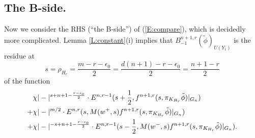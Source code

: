 \documentclass[10pt]{amsart}
\theoremstyle{plain}
\numberwithin{equation}{section}
\begin{document}
\subsection{ \bf The B-side.}
 Now we consider the RHS (``the B-side'') of (\ref{E:compare}), which
 is decidedly more complicated. Lemma \ref{L:constant}(i) implies that
 $ B^{n+1,r}_{-1}(\tilde{\phi})_{U(Y_1)}$ is the residue at 
 \[  s = \rho_{H_r}= \frac{m-r-\epsilon_0}{2} =  \frac{d(n+1) - r
   -\epsilon_0}{2} = \frac{n+1-r}{2} \]
 of the function 
 \begin{align}\label{E:B-side}
   & \chi | - |^{s+ n+1 - \frac{r - \epsilon_0}{2} } \cdot
   E^{n,r-1}(s+\frac{1}{2}, f^{n+1,r}(s, \pi_{K_{H_r}}
   \tilde{\phi})|_{G_{n}}) \\
+ &\chi |-|^{m/2} \cdot E^{n,r} ( s,  M(w^+,s) f^{n+1,r}(s,
\pi_{K_{H_r}} \tilde{\phi})|_{G_{n}} ) \notag \\
+ &\chi |-|^{-s + n+1 - \frac{r- \epsilon_0}{2}} \cdot E^{n,r-1}(s -
\frac{1}{2},  M(w^-,s) f^{n+1,r}(s, \pi_{K_{H_r}}
\tilde{\phi})|_{G_{n}}).  \notag
\end{align}
\end{document}

